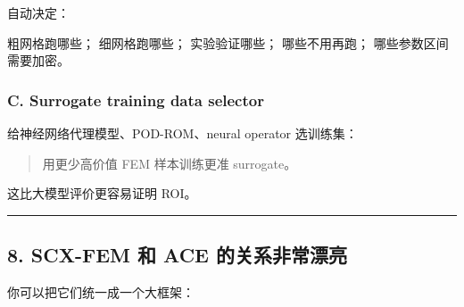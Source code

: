 \documentclass[
  12pt,
]{ctexart}
\newenvironment{Shaded}{}{}
\newcommand{\NormalTok}[1]{#1}
\begin{document}
自动决定：

\begin{Shaded}
\begin{Highlighting}[]
\NormalTok{粗网格跑哪些；}
\NormalTok{细网格跑哪些；}
\NormalTok{实验验证哪些；}
\NormalTok{哪些不用再跑；}
\NormalTok{哪些参数区间需要加密。}
\end{Highlighting}
\end{Shaded}

\subsubsection{C. Surrogate training data
selector}\label{c.-surrogate-training-data-selector}

给神经网络代理模型、POD-ROM、neural operator 选训练集：

\begin{quote}
用更少高价值 FEM 样本训练更准 surrogate。
\end{quote}

这比大模型评价更容易证明 ROI。

\begin{center}\rule{0.5\linewidth}{0.5pt}\end{center}

\subsection{8. SCX-FEM 和 ACE
的关系非常漂亮}\label{scx-fem-ux548c-ace-ux7684ux5173ux7cfbux975eux5e38ux6f02ux4eae}

你可以把它们统一成一个大框架：
\end{document}
